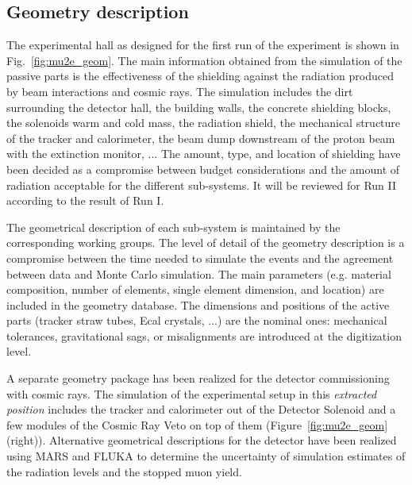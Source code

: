 \subsection{Geometry description}
The experimental hall as designed for the first run of the experiment is shown in Fig.~\ref{fig:mu2e_geom}. The main information obtained from the simulation of the passive parts is the effectiveness of the shielding against the radiation produced by beam interactions and cosmic rays. The simulation includes the dirt surrounding the detector hall, the building walls, the concrete shielding blocks, the solenoids warm and cold mass, the radiation shield, the mechanical structure of the tracker and calorimeter, the beam dump downstream of the proton beam with the extinction monitor, ... The amount, type, and location of shielding have been decided as a compromise between budget considerations and the amount of radiation acceptable for the different sub-systems. It will be reviewed for Run II according to the result of Run I.
 
The geometrical description of each sub-system is maintained by the corresponding working groups. The level of detail of the geometry description is a compromise between the time needed to simulate the events and the agreement between data and Monte Carlo simulation. The main parameters (e.g. material composition, number of elements, single element dimension, and location) are included in the geometry database. The dimensions and positions of the active parts (tracker straw tubes, Ecal crystals, ...) are the nominal ones: mechanical tolerances, gravitational sags, or misalignments are introduced at the digitization level.

A separate geometry package has been realized for the detector commissioning with cosmic rays. The simulation of the experimental setup in this {\em extracted position} includes the tracker and calorimeter out of the Detector Solenoid and a few modules of the Cosmic Ray Veto on top of them (Figure~\ref{fig:mu2e_geom}(right)). Alternative geometrical descriptions for the detector have been realized using MARS and FLUKA to determine the uncertainty of simulation estimates of the radiation levels and the stopped muon yield.

